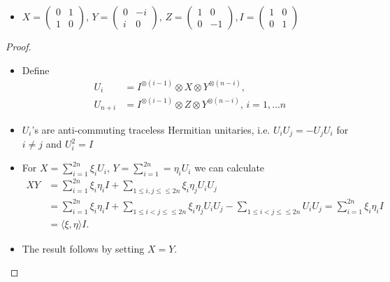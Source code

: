 \begin{frame}
	\begin{itemize}
		\item<1->{\footnotesize $
		X = \begin{pmatrix}
		0 & 1 \\ 1 & 0
		\end{pmatrix}, \, Y = \begin{pmatrix}
		0 & -i \\ i & 0
		\end{pmatrix}, \, Z = \begin{pmatrix}
		1 & 0 \\ 0 & -1
		\end{pmatrix}, I = \begin{pmatrix}
		1 & 0 \\ 0 & 1
		\end{pmatrix} $}
	\end{itemize}
		\begin{proof}
			\begin{itemize}
				\item Define 
				\begin{align*}
					U_i &= I^{\otimes (i-1)} \otimes X \otimes Y^{\otimes (n-i)},   \\
					U_{n+i} &= I^{\otimes (i-1)} \otimes Z \otimes Y^{\otimes (n-i)}, \, i=1,\hdots n 
				\end{align*}
				\item $ U_i $'s are anti-commuting traceless Hermitian unitaries, i.e.
				$ U_iU_j = -U_jU_i $ for $ i \neq j $ and $ U_i^2 = I $ 
				\item For $ X = \sum_{i = 1}^{2n}\xi_i U_i$, $ Y = \sum_{i = 1}^{2n} = \eta_iU_i $ we can calculate 
				\begin{align*}
				XY &= \sum_{i = 1}^{2n} \xi_i \eta_i I + \sum_{1 \le i,j \le \le 2n}\xi_i\eta_j U_i U_j   \\
				&= \sum_{i = 1}^{2n} \xi_i \eta_i I + \sum_{1 \le i < j \le \le 2n}\xi_i\eta_jU_iU_j - \sum_{1 \le i < j \le \le 2n}U_iU_j =\sum_{i = 1}^{2n} \xi_i \eta_i I \\
				&= \langle \xi, \eta \rangle I.
				\end{align*}
				\item The result follows by setting $ X = Y $.
			\end{itemize}
		\end{proof}
\end{frame}

